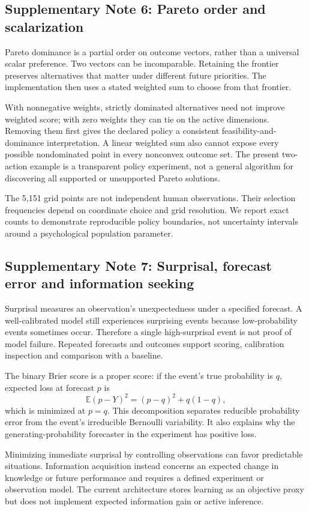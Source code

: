 \documentclass[10pt,a4paper]{article}
\begin{document}
\subsection*{Supplementary Note 6: Pareto order and scalarization}
Pareto dominance is a partial order on outcome vectors, rather than a universal scalar preference. Two vectors can be incomparable. Retaining the frontier preserves alternatives that matter under different future priorities. The implementation then uses a stated weighted sum to choose from that frontier.

With nonnegative weights, strictly dominated alternatives need not improve weighted score; with zero weights they can tie on the active dimensions. Removing them first gives the declared policy a consistent feasibility-and-dominance interpretation. A linear weighted sum also cannot expose every possible nondominated point in every nonconvex outcome set. The present two-action example is a transparent policy experiment, not a general algorithm for discovering all supported or unsupported Pareto solutions.

The 5,151 grid points are not independent human observations. Their selection frequencies depend on coordinate choice and grid resolution. We report exact counts to demonstrate reproducible policy boundaries, not uncertainty intervals around a psychological population parameter.

\subsection*{Supplementary Note 7: Surprisal, forecast error and information seeking}
Surprisal measures an observation's unexpectedness under a specified forecast. A well-calibrated model still experiences surprising events because low-probability events sometimes occur. Therefore a single high-surprisal event is not proof of model failure. Repeated forecasts and outcomes support scoring, calibration inspection and comparison with a baseline.

The binary Brier score is a proper score: if the event's true probability is $q$, expected loss at forecast $p$ is
\[
\mathbb{E}(p-Y)^2=(p-q)^2+q(1-q),
\]
which is minimized at $p=q$. This decomposition separates reducible probability error from the event's irreducible Bernoulli variability. It also explains why the generating-probability forecaster in the experiment has positive loss.

Minimizing immediate surprisal by controlling observations can favor predictable situations. Information acquisition instead concerns an expected change in knowledge or future performance and requires a defined experiment or observation model. The current architecture stores learning as an objective proxy but does not implement expected information gain or active inference.
\end{document}
